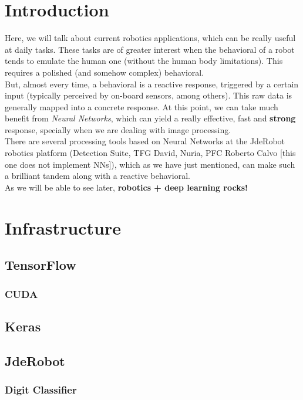 \chapter{Introduction}
Here, we will talk about current robotics applications, which can be really useful at daily tasks. These tasks are of greater interest when the behavioral of a robot tends to emulate the human one (without the human body limitations). This requires a polished (and somehow complex) behavioral.\\

But, almost every time, a behavioral is a reactive response, triggered by a certain input (typically perceived by on-board sensors, among others). This raw data is generally mapped into a concrete response. At this point, we can take much benefit from \emph{Neural Networks}, which can yield a really effective, fast and \textbf{strong} response, specially when we are dealing with image processing.\\

There are several processing tools based on Neural Networks at the JdeRobot robotics platform (Detection Suite, TFG David, Nuria, PFC Roberto Calvo [this one does not implement NNs]), which as we have just mentioned, can make such a brilliant tandem along with a reactive behavioral.\\

As we will be able to see later, \textbf{robotics + deep learning rocks!}

\chapter{Infrastructure}

\section{TensorFlow}
\subsection{CUDA}
\section{Keras}
\section{JdeRobot}
\subsection{Digit Classifier}
